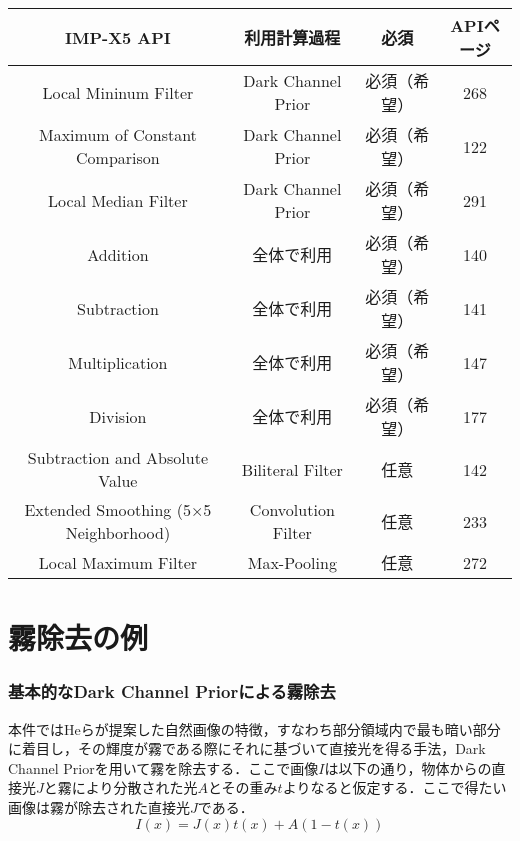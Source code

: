 \documentclass{jsarticle}
\begin{document}
\begin{table}[htb]
  \begin{tabular} {|c|c|c|c|} \hline
    IMP-X5 API & 利用計算過程 & 必須 & APIページ \\ \hline
    Local Mininum Filter & Dark Channel Prior & 必須（希望） & 268  \\
    Maximum of Constant Comparison &  Dark Channel Prior & 必須（希望） & 122  \\
    Local Median Filter &  Dark Channel Prior & 必須（希望） & 291  \\
    Addition & 全体で利用 & 必須（希望） & 140 \\ 
    Subtraction & 全体で利用 & 必須（希望） & 141 \\
    Multiplication & 全体で利用 & 必須（希望） & 147 \\
    Division & 全体で利用 & 必須（希望） & 177 \\ \hline
    Subtraction and Absolute Value & Biliteral Filter & 任意 & 142 \\ 
    Extended Smoothing (5×5 Neighborhood) & Convolution Filter & 任意 & 233 \\ 
    Local Maximum Filter & Max-Pooling & 任意 & 272 \\ \hline
  \end{tabular}
\end{table}


\part{霧除去の例}
\label{霧除去の例}


\section{基本的なDark Channel Priorによる霧除去}
\label{基本的なDark Channel Priorによる霧除去}

本件ではHe\cite{1}らが提案した自然画像の特徴，すなわち部分領域内で最も暗い部分に着目し，その輝度が霧である際にそれに基づいて直接光を得る手法，Dark Channel Priorを用いて霧を除去する．ここで画像$I$は以下の通り，物体からの直接光$J$と霧により分散された光$A$とその重み$t$よりなると仮定する．ここで得たい画像は霧が除去された直接光$J$である．
\[
I(x)=J(x)t(x)+A(1-t(x))
\]
\end{document}
